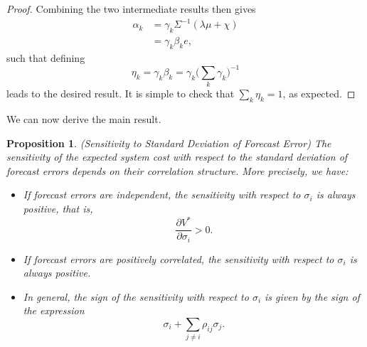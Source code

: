 \documentclass{article}
\newtheorem{proposition}{Proposition}
\begin{document}
\begin{proof}
Combining the two intermediate results then gives
\begin{align*}
\alpha_k &= \gamma_k \Sigma^{-1} (\lambda \mu + \chi)\\
&= \gamma_k \beta_k e,
\end{align*}
such that defining
\begin{equation*}
\eta_k = \gamma_k \beta_k =  \gamma_k \bigg(\sum_k \gamma_k\bigg)^{-1}
\end{equation*}
leads to the desired result. It is simple to check that $\sum_k \eta_k = 1$, as expected.
\end{proof}

We can now derive the main result.

\begin{proposition}\label{SensitivityStandardDeviation}
(Sensitivity to Standard Deviation of Forecast Error) The sensitivity of the expected system cost with respect to the standard deviation of forecast errors depends on their correlation structure. More precisely, we have:
\begin{itemize}
\item[(i)] If forecast errors are independent, the sensitivity with respect to $\sigma_i$ is always positive, that is, 
\begin{equation*}
\frac{\partial V^*}{\partial \sigma_i} > 0.
\end{equation*}
\item[(ii)] If forecast errors are positively correlated, the sensitivity with respect to $\sigma_i$ is always positive.
\item[(iii)] In general, the sign of the sensitivity with respect to $\sigma_i$ is given by the sign of the expression
\begin{equation*}
\sigma_i +\sum_{j \ne i} \rho_{ij} \sigma_j.
\end{equation*}
\end{itemize}
\end{proposition}
\end{document}
